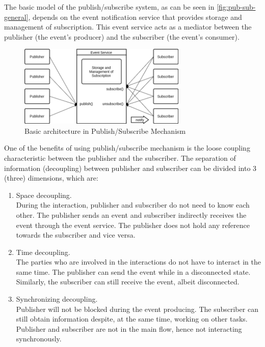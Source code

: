 \documentclass[conference]{IEEEtran}
\begin{document}
The basic model of the publish/subscribe system, as can be seen in \autoref{fig:pub-sub-general}, depends on the event notification service that provides storage and management of subscription. This event service acts as a mediator between the publisher (the event's producer) and the subscriber (the event's consumer). 

\begin{figure}[!]
	\centering
	\includegraphics[width=8cm]{Resources/Images/pub-sub-general}
	\caption{Basic architecture in Publish/Subscribe Mechanism \cite{eugster_many_2003}}
	\label{fig:pub-sub-general}
\end{figure}


One of the benefits of using publish/subscribe mechanism is the loose coupling characteristic \cite{eugster_many_2003} between the publisher and the subscriber. The separation of information (decoupling) between publisher and subscriber can be divided into 3 (three) dimensions, which are:

\begin{enumerate}
	\item Space decoupling. \\
	During the interaction, publisher and subscriber do not need to know each other. The publisher sends an event and subscriber indirectly receives the event through the event service. The publisher does not hold any reference towards the subscriber and vice versa. 
	\item Time decoupling. \\
	The parties who are involved in the interactions do not have to interact in the same time. The publisher can send the event while in a disconnected state. Similarly, the subscriber can still receive the event, albeit disconnected. 
	\item Synchronizing decoupling. \\
	Publisher will not be blocked during the event producing. The subscriber can still obtain information despite, at the same time, working on other tasks. Publisher and subscriber are not in the main flow, hence not interacting synchronously. 
\end{enumerate}
\end{document}

